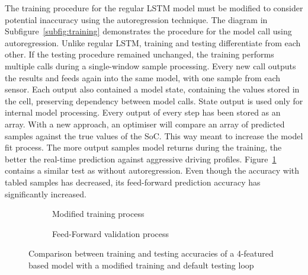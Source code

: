 %
%
The training procedure for the regular LSTM model must be modified to consider potential inaccuracy using the autoregression technique.
The diagram in \mbox{Subfigure~\ref{subfig:training}} demonstrates the procedure for the model call using autoregression.
Unlike regular LSTM, training and testing differentiate from each other.
If the testing procedure remained unchanged, the training performs multiple calls during a single-window sample processing.
Every new call outputs the results and feeds again into the same model, with one sample from each sensor.
Each output also contained a model state, containing the values stored in the cell, preserving dependency between model calls.
State output is used only for internal model processing.
Every output of every step has been stored as an array.
With a new approach, an optimiser will compare an array of predicted samples against the true values of the SoC.
This way meant to increase the model fit process.
The more output samples model returns during the training, the better the real-time prediction against aggressive driving profiles.
\mbox{Figure~\ref{fig:modefied_tr}} contains a similar test as without autoregression.
Even though the accuracy with tabled samples has decreased, its feed-forward prediction accuracy has significantly increased.
\begin{figure}[htbp]
    \centering
    \begin{subfigure}[b]{\columnwidth}
        \centering
        
        \caption{Modified training process}
    \end{subfigure}
    \begin{subfigure}[b]{\columnwidth}
        \centering
        
        \caption{Feed-Forward validation process}
    \end{subfigure}
    \caption{Comparison between training and testing accuracies of a 4-featured based model with a modified training and default testing loop}
    \label{fig:modefied_tr}
\end{figure}